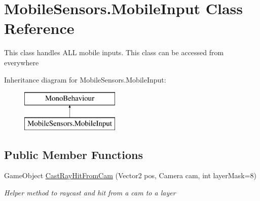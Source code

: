 \hypertarget{class_mobile_sensors_1_1_mobile_input}{}\section{Mobile\+Sensors.\+Mobile\+Input Class Reference}
\label{class_mobile_sensors_1_1_mobile_input}


This class handles A\+LL mobile inputs. This class can be accessed from everywhere  


Inheritance diagram for Mobile\+Sensors.\+Mobile\+Input\+:\begin{figure}[H]
\begin{center}
\leavevmode
\includegraphics[height=2.000000cm]{class_mobile_sensors_1_1_mobile_input}
\end{center}
\end{figure}
\subsection*{Public Member Functions}
\begin{DoxyCompactItemize}
\item 
Game\+Object \mbox{\hyperlink{class_mobile_sensors_1_1_mobile_input_a65f291342aee293cd5df1684318e4440}{Cast\+Ray\+Hit\+From\+Cam}} (Vector2 pos, Camera cam, int layer\+Mask=8)
\begin{DoxyCompactList}\small\item\em Helper method to raycast and hit from a cam to a layer \end{DoxyCompactList}\end{DoxyCompactItemize}
